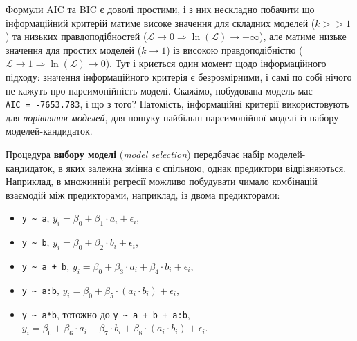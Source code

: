 \documentclass[
  11pt,
]{book}
\begin{document}
Формули AIC та BIC є доволі простими, і з них нескладно побачити що інформаційний критерій матиме високе значення для складних моделей (\(k >> 1\)) та низьких правдоподібностей (\(\mathcal{L} \rightarrow 0 \Rightarrow \ln (\mathcal{L}) \rightarrow - \infty\)), але матиме низьке значення для простих моделей (\(k \rightarrow 1\)) із високою правдоподібністю (\(\mathcal{L} \rightarrow 1 \Rightarrow \ln (\mathcal{L}) \rightarrow 0\)). Тут і криється один момент щодо інформаційного підходу: значення інформаційного критерія є безрозмірними, і самі по собі нічого не кажуть про парсимонійність моделі. Скажімо, побудована модель має \texttt{AIC\ =\ -7653.783}, і що з того? Натомість, інформаційні критерії використовують для \emph{порівняння моделей}, для пошуку найбільш парсимонійної моделі із набору моделей-кандидаток.

Процедура \textbf{вибору моделі} (\emph{model selection}) передбачає набір моделей-кандидаток, в яких залежна змінна є спільною, однак предиктори відрізняються. Наприклад, в множинній регресії можливо побудувати чимало комбінацій взаємодій між предикторами, наприклад, із двома предикторами:

\begin{itemize}
\item
  \texttt{y\ \textasciitilde{}\ a}, \(y_i = \beta_0 + \beta_1 \cdot a_i + \epsilon_i\),
\item
  \texttt{y\ \textasciitilde{}\ b}, \(y_i = \beta_0 + \beta_2 \cdot b_i + \epsilon_i\),
\item
  \texttt{y\ \textasciitilde{}\ a\ +\ b}, \(y_i = \beta_0 + \beta_3 \cdot a_i + \beta_4 \cdot b_i + \epsilon_i\),
\item
  \texttt{y\ \textasciitilde{}\ a:b}, \(y_i = \beta_0 + \beta_5 \cdot (a_i \cdot b_i) + \epsilon_i\),
\item
  \texttt{y\ \textasciitilde{}\ a*b}, тотожно до \texttt{y\ \textasciitilde{}\ a\ +\ b\ +\ a:b}, \(y_i = \beta_0 + \beta_6 \cdot a_i + \beta_7 \cdot b_i + \beta_8 \cdot (a_i \cdot b_i) + \epsilon_i\).
\end{itemize}
\end{document}
